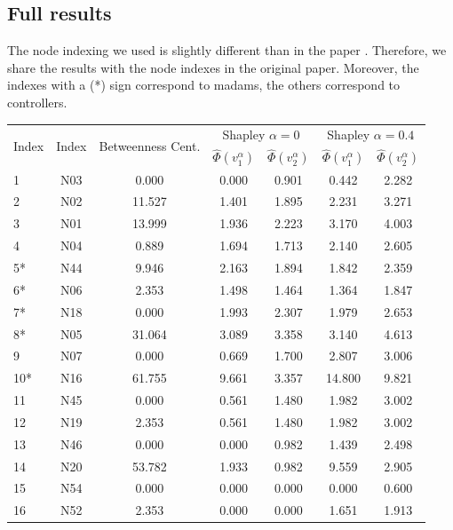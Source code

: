\documentclass[10p]{article}
\theoremstyle{definition}
\theoremstyle{definition}
\begin{document}
\begin{appendices}
\section{Full results} \label{AppendixValues}
The node indexing we used is slightly different than in the paper \cite{mancuso2014not}. Therefore, we share the results with the node indexes in the original paper. Moreover, the indexes with a (*) sign correspond to madams, the others correspond to controllers.
\begin{table}[!ht]\centering
\begin{tabular}{lcccccc}
\toprule
\multirow{2}[3]{*}{Index} & \multirow{2}[3]{*}{\cite{mancuso2014not} Index} &  \multirow{2}[3]{*}{Betweenness Cent.} &\multicolumn{2}{c}{Shapley $\alpha = 0$} & \multicolumn{2}{c}{Shapley $\alpha = 0.4$} \\
\cmidrule(lr){4-5} \cmidrule(lr){6-7}
 & & & $\hat{\Phi}(v_1^\alpha)$ & $\hat{\Phi}(v_2^\alpha)$ & $\hat{\Phi}(v_1^\alpha)$ & $\hat{\Phi}(v_2^\alpha)$ \\
\midrule
1 & N03 & 0.000 & 0.000  &0.901 & 0.442 & 2.282 \\ 
 \hline
 2 & N02 & 11.527 & 1.401 &1.895 & 2.231 & 3.271\\
 \hline
 3 & N01 & 13.999 & 1.936 &2.223 & 3.170 & 4.003\\
 \hline
 4 & N04 & 0.889 & 1.694& 1.713& 2.140 & 2.605\\
 \hline
 5* & N44 & 9.946 & 2.163& 1.894 & 1.842 & 2.359\\
 \hline
 6* & N06 & 2.353 & 1.498&1.464 & 1.364 &1.847\\ 
 \hline
 7* & N18 & 0.000 & 1.993& 2.307& 1.979 & 2.653 \\
 \hline
 8* & N05 & 31.064 & 3.089 &3.358 & 3.140 & 4.613\\
 \hline
 9 & N07 & 0.000 & 0.669& 1.700& 2.807 & 3.006 \\
 \hline
 10* & N16 & 61.755 & 9.661& 3.357&14.800 &  9.821\\
 \hline
 11 & N45 & 0.000 & 0.561& 1.480& 1.982 & 3.002 \\ 
 \hline
 12 & N19 & 2.353 & 0.561&1.480 & 1.982 & 3.002 \\
 \hline
 13 & N46 & 0.000 & 0.000 &0.982& 1.439 &2.498 \\
 \hline
 14 & N20 & 53.782 & 1.933& 0.982& 9.559 & 2.905 \\
 \hline
 15 & N54 & 0.000 & 0.000&  0.000 & 0.000 & 0.600 \\
 \hline
 16 & N52 & 2.353 & 0.000&  0.000& 1.651 &  1.913 \\ 

\end{tabular}
\end{table}
\end{appendices}
\end{document}
